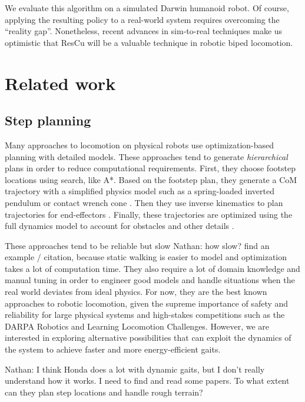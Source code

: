 \documentclass[a4paper]{article}
\newcommand{\nhatch}[1]{{\leavevmode\color{blue} Nathan: #1}}
\begin{document}
We evaluate this algorithm on a simulated Darwin humanoid robot.
Of course, applying the resulting policy to a real-world system requires overcoming the ``reality gap''.
Nonetheless, recent advances in sim-to-real techniques \citep{tan2016simulation, tan2018sim} make us optimistic that ResCu will be a valuable technique in robotic biped locomotion.

\section{Related work}

\subsection{Step planning}

Many approaches to locomotion on physical robots use optimization-based planning with detailed models.
These approaches tend to generate \emph{hierarchical} plans in order to reduce computational requirements.
First, they choose footstep locations using search, like A*.
Based on the footstep plan, they generate a CoM trajectory with a simplified physics model such as a spring-loaded inverted pendulum \citep{mordatch2010robust} or contact wrench cone \citep{dai2016planning}.
Then they use inverse kinematics to plan trajectories for end-effectors \citep{zucker2010optimization}.
Finally, these trajectories are optimized using the full dynamics model to account for obstacles and other details \citep{ratliff2009chomp}.

These approaches tend to be reliable but slow \nhatch{how slow? find an example / citation}, because static walking is easier to model and optimization takes a lot of computation time.
They also require a lot of domain knowledge and manual tuning in order to engineer good models and handle situations when the real world deviates from ideal physics.
For now, they are the best known approaches to robotic locomotion, given the supreme importance of safety and reliability for large physical systems and high-stakes competitions such as the DARPA Robotics and Learning Locomotion Challenges.
However, we are interested in exploring alternative possibilities that can exploit the dynamics of the system to achieve faster and more energy-efficient gaits.

\nhatch{I think Honda does a lot with dynamic gaits, but I don't really understand how it works. I need to find and read some papers. To what extent can they plan step locations and handle rough terrain?}
\end{document}
